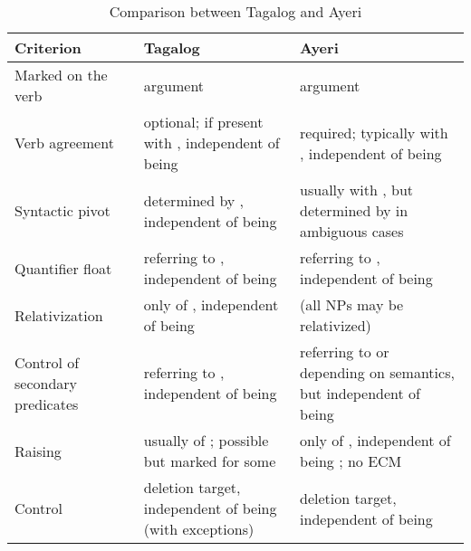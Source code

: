 \begin{table} \centering
\caption[Comparison between Tagalog and Ayeri]{Comparison between Tagalog
\citep{kroeger1991} and Ayeri}
\begin{tabu} to 
\toprule\tableheaderfont
Criterion
	& Tagalog
	& Ayeri
	\\

\toprule

Marked on the verb
	& \Nom{} argument
	& \Top{} argument
	\\

\midrule

Verb agreement
	& optional; if present with \Nom{}, independent of being \Aarg{}
	& required; typically with \Aarg{}, independent of being \Top{}
	\\

\midrule

Syntactic pivot
	& determined by \Nom{}, independent of being \Aarg{}
	& usually with \Aarg{}, but determined by \Top{} in ambiguous cases
	\\

\midrule

Quantifier float
	& referring to \Nom{}, independent of being \Aarg{}
	& referring to \Aarg{}, independent of being \Top{}
	\\

\midrule

Relativization
	& only of \Nom{}, independent of being \Aarg{}
	& (all NPs may be relativized)
	\\

\midrule

Control of secondary predicates
	& referring to \Nom{}, independent of being \Aarg{}
	& referring to \Aarg{} or \Parg{} depending on semantics, but 
		independent of being \Top{}
	\\

\midrule

Raising
	& usually of \Nom{}; \Aarg{} possible but marked for some
	& only of \Aarg{}, independent of being \Top{}; no ECM
	\\

\midrule

Control
	& \Aarg{} deletion target, independent of being \Nom{} (with exceptions)
	& \Aarg{} deletion target, independent of being \Top{}
	\\

\bottomrule
\end{tabu}
\label{tab:tagayrcomp}
\end{table}

